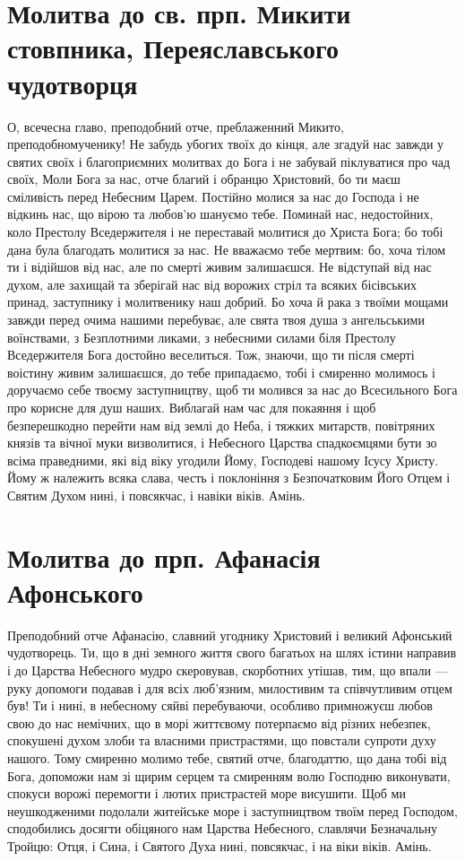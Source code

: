 \documentclass[chapters.tex]{subfiles}
\begin{document}
\section{Молитва до св. прп. Микити стовпника, Переяславського чудотворця}
О, всечесна главо, преподобний отче, преблаженний Микито, преподобномученику! Не забудь убогих твоїх до кінця, але згадуй нас завжди у святих своїх і благоприємних молитвах до Бога і не забувай піклуватися про чад своїх, Моли Бога за нас, отче благий і обранцю Христовий, бо ти маєш сміливість перед Небесним Царем. Постійно молися за нас до Господа і не відкинь нас, що вірою та любов’ю шануємо тебе. Поминай нас, недостойних, коло Престолу Вседержителя і не переставай молитися до Христа Бога; бо тобі дана була благодать молитися за нас. Не вважаємо тебе мертвим: бо, хоча тілом ти і відійшов від нас, але по смерті живим залишаєшся. Не відступай від нас духом, але захищай та зберігай нас від ворожих стріл та всяких бісівських принад, заступнику і молитвенику наш добрий. Бо хоча й рака з твоїми мощами завжди перед очима нашими перебуває, але свята твоя душа з ангельськими воїнствами, з Безплотними ликами, з небесними силами біля Престолу Вседержителя Бога достойно веселиться. Тож, знаючи, що ти після смерті воістину живим залишаєшся, до тебе припадаємо, тобі і смиренно молимось і доручаємо себе твоєму заступництву, щоб ти молився за нас до Всесильного Бога про корисне для душ наших. Виблагай нам час для покаяння і щоб безперешкодно перейти нам від землі до Неба, і тяжких митарств, повітряних князів та вічної муки визволитися, і Небесного Царства спадкоємцями бути зо всіма праведними, які від віку угодили Йому, Господеві нашому Ісусу Христу. Йому ж належить всяка слава, честь і поклоніння з Безпочатковим Його Отцем і Святим Духом нині, і повсякчас, і навіки віків. Амінь.

\section{Молитва до прп. Афанасія Афонського}
Преподобний отче Афанасію, славний угоднику Христовий і великий Афонський чудотворець. Ти, що в дні земного життя свого багатьох на шлях істини направив і до Царства Небесного мудро скеровував, скорботних утішав, тим, що впали — руку допомоги подавав і для всіх люб’язним, милостивим та співчутливим отцем був! Ти і нині, в небесному сяйві перебуваючи, особливо примножуєш любов свою до нас немічних, що в морі життєвому потерпаємо від різних небезпек, спокушені духом злоби та власними пристрастями, що повстали супроти духу нашого. Тому смиренно молимо тебе, святий отче, благодаттю, що дана тобі від Бога, допоможи нам зі щирим серцем та смиренням волю Господню виконувати, спокуси ворожі перемогти і лютих пристрастей море висушити. Щоб ми неушкодженими подолали житейське море і заступництвом твоїм перед Господом, сподобились досягти обіцяного нам Царства Небесного, славлячи Безначальну Тройцю: Отця, і Сина, і Святого Духа нині, повсякчас, і на віки віків. Амінь.
\end{document}
